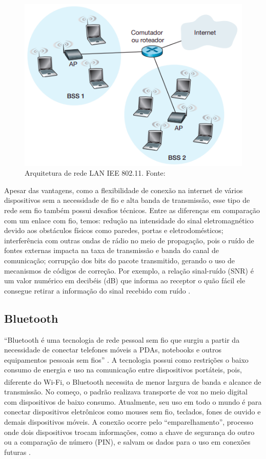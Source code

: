 \begin{figure}[ht]
    \centering
    \includegraphics[width=.42\textwidth]{img/wifi-design.png}
    \caption{Arquitetura de rede LAN IEE 802.11. Fonte:\cite{redeskurose2010}}\label{figWifi}
\end{figure}

Apesar das vantagens, como a flexibilidade de conexão na internet de vários dispositivos sem a necessidade 
de fio e alta banda de transmissão, esse tipo de rede sem fio também possui desafios técnicos. Entre as diferenças 
em comparação com um enlace com fio, temos: redução na intensidade do sinal eletromagnético devido aos obstáculos físicos 
como paredes, portas e eletrodomésticos; interferência com outras ondas de rádio no meio de propagação, pois o ruído de fontes
externas impacta na taxa de transmissão e banda do canal de comunicação; corrupção dos bits do pacote transmitido, gerando 
o uso de mecanismos de códigos de correção. Por exemplo, a relação sinal-ruído (SNR) é um valor numérico em decibéis (dB) que informa 
ao receptor o quão fácil ele consegue retirar a informação do sinal recebido com ruído \cite[pp. 408]{redeskurose2010}.

\subsection{Bluetooth}

``Bluetooth é uma tecnologia de rede pessoal sem fio que surgiu a partir da necessidade de
conectar telefones móveis a PDAs, notebooks e outros equipamentos pessoais sem fios'' \cite[pp. 138]{sistemas-distribuidos-coulouris2013}. A tecnologia
possui como restrições o baixo consumo de energia e uso na comunicação entre dispositivos portáteis, pois, diferente do Wi-Fi\textsuperscript{\textregistered}, o Bluetooth\textsuperscript{\textregistered} 
necessita de menor largura de banda e alcance de transmissão. No começo, o padrão realizava transporte de voz no meio digital com dispositivos de baixo consumo. Atualmente, seu uso em todo o mundo é para conectar 
dispositivos eletrônicos como mouses sem fio, teclados, fones de ouvido e demais dispositivos móveis. A conexão ocorre pelo ``emparelhamento'', processo onde dois dispositivos 
trocam informações, como a chave de segurança do outro ou a comparação de número (PIN), e salvam os dados para o uso em conexões futuras \cite{blueetoothIntel}. 

